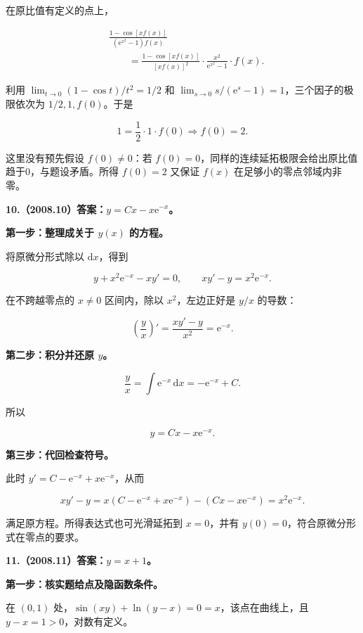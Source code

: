 \documentclass[UTF8,11pt,fontset=windows]{ctexart}
\begin{document}
在原比值有定义的点上，

$$
\begin{aligned}
&\frac{1-\cos[xf(x)]}{(\mathrm e^{x^2}-1)f(x)}\\
&\qquad=\frac{1-\cos[xf(x)]}{[xf(x)]^2}
\cdot\frac{x^2}{\mathrm e^{x^2}-1}\cdot f(x).
\end{aligned}
$$

利用 $\lim_{t\to0}(1-\cos t)/t^2=1/2$ 和 $\lim_{s\to0}s/(\mathrm e^s-1)=1$，三个因子的极限依次为 $1/2,1,f(0)$。于是

$$
1=\frac12\cdot1\cdot f(0)
\Longrightarrow\boxed{f(0)=2}.
$$

这里没有预先假设 $f(0)\ne0$：若 $f(0)=0$，同样的连续延拓极限会给出原比值趋于0，与题设矛盾。所得 $f(0)=2$ 又保证 $f(x)$ 在足够小的零点邻域内非零。

\clearpage

\textbf{10.（2008.10）答案：$y=Cx-x\mathrm e^{-x}$。}

\textbf{第一步：整理成关于 $y(x)$ 的方程。}

将原微分形式除以 $\mathrm dx$，得到

$$
y+x^2\mathrm e^{-x}-xy'=0,
\qquad xy'-y=x^2\mathrm e^{-x}.
$$

在不跨越零点的 $x\ne0$ 区间内，除以 $x^2$，左边正好是 $y/x$ 的导数：

$$
\left(\frac yx\right)'=\frac{xy'-y}{x^2}=\mathrm e^{-x}.
$$

\textbf{第二步：积分并还原 $y$。}

$$
\frac yx=\int\mathrm e^{-x}\,\mathrm dx
=-\mathrm e^{-x}+C.
$$

所以

$$
\boxed{y=Cx-x\mathrm e^{-x}}.
$$

\textbf{第三步：代回检查符号。}

此时 $y'=C-\mathrm e^{-x}+x\mathrm e^{-x}$，从而

$$
xy'-y=x(C-\mathrm e^{-x}+x\mathrm e^{-x})
-(Cx-x\mathrm e^{-x})=x^2\mathrm e^{-x}.
$$

满足原方程。所得表达式也可光滑延拓到 $x=0$，并有 $y(0)=0$，符合原微分形式在零点的要求。

\clearpage

\textbf{11.（2008.11）答案：$y=x+1$。}

\textbf{第一步：核实题给点及隐函数条件。}

在 $(0,1)$ 处，$\sin(xy)+\ln(y-x)=0=x$，该点在曲线上，且 $y-x=1>0$，对数有定义。
\end{document}
